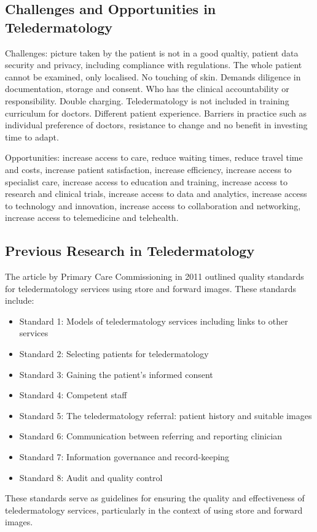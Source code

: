 \subsection{Challenges and Opportunities in Teledermatology}
\label{sub:ChallengesOpportunitiesTeledermatology}
Challenges: picture taken by the patient is not in a good qualtiy, patient data security and privacy, including compliance with regulations. The whole patient cannot be examined, only localised. No touching of skin. Demands diligence in documentation, storage and consent. Who has the clinical accountability or responsibility. Double charging. Teledermatology is not included in training curriculum for doctors. Different patient experience. Barriers in practice such as individual preference of doctors, resistance to change and no benefit in investing time to adapt. \par
\vspace{\baselineskip}
\noindent
Opportunities: increase access to care, reduce waiting times, reduce travel time and costs, increase patient satisfaction, increase efficiency, increase access to specialist care, increase access to education and training, increase access to research and clinical trials, increase access to data and analytics, increase access to technology and innovation, increase access to collaboration and networking, increase access to telemedicine and telehealth. \par

\subsection{Previous Research in Teledermatology}
\label{sub:PreviousResearchTeledermatology}
The article by Primary Care Commissioning in 2011 outlined quality standards for teledermatology services using store and forward images. These standards include: \par
\noindent
\begin{itemize}
    \item Standard 1: Models of teledermatology services including links to other services
    \item Standard 2: Selecting patients for teledermatology
    \item Standard 3: Gaining the patient's informed consent
    \item Standard 4: Competent staff
    \item Standard 5: The teledermatology referral: patient history and suitable images
    \item Standard 6: Communication between referring and reporting clinician
    \item Standard 7: Information governance and record-keeping
    \item Standard 8: Audit and quality control
\end{itemize}
\par
\noindent
These standards serve as guidelines for ensuring the quality and effectiveness of teledermatology services, particularly in the context of using store and forward images.